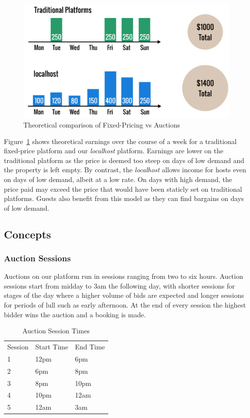 \begin{figure}[!h]
  \includegraphics[width=\linewidth]{assets/fixedvsdynamic.png}
  \caption{Theoretical comparison of Fixed-Pricing vs Auctions}
  \label{fig:fixedVsDynamic}
\end{figure}

Figure~\ref{fig:fixedVsDynamic} shows theoretical earnings over the course of
a week for a traditional fixed-price platform and our \emph{localhost} platform.
Earnings are lower on the traditional platform as the price is deemed too steep
on days of low demand and the property is left empty.
By contrast, the \emph{localhost} allows income for hosts even on days of low demand, albeit
at a low rate. On days with high demand, the price paid may exceed the price that would
have been staticly set on traditional platforms. Guests also benefit from this model
as they can find bargains on days of low demand.

\subsection{Concepts}

\subsubsection{Auction Sessions}
Auctions on our platform run in sessions ranging from two to six hours.
Auction sessions start from midday to 3am the following day, with shorter sessions
for stages of the day where a higher volume of bids are expected and longer sessions
for periods of lull such as early afternoon.
At the end of every session the highest bidder wins the auction and a booking is made.

\begin{table}[!h]
\centering
  \begin{tabular}{lll}
  Session & Start Time & End Time \\
  1       & 12pm       & 6pm      \\
  2       & 6pm        & 8pm      \\
  3       & 8pm        & 10pm     \\
  4       & 10pm       & 12am     \\
  5       & 12am       & 3am
  \end{tabular}
  \caption{Auction Session Times}
\end{table}

